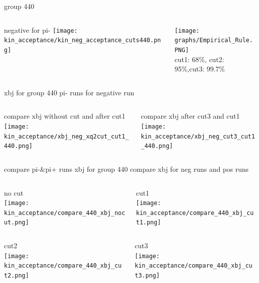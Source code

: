 \documentclass[aspectratio=169,xcolor=dvipsnames]{beamer}
\begin{document}
\begin{frame}{group 440}
  \begin{columns}
    \begin{column}[T]{0.5\textwidth}
      negative for pi-
      \texttt{[image: kin\_acceptance/kin\_neg\_acceptance\_cuts440.png]}
    \end{column}
    \begin{column}[T]{0.5\textwidth}
       \texttt{[image: graphs/Empirical\_Rule.PNG]}
       \\
       cut1: 68\%, cut2: 95\%,cut3: 99.7\% 
    \end{column}
  \end{columns}

\end{frame}

\begin{frame}{xbj for group 440 pi- runs}
  for negative run 
  \begin{columns}
    \begin{column}[T]{0.5\textwidth}
      compare xbj without cut and after cut1
      \texttt{[image: kin\_acceptance/xbj\_neg\_xq2cut\_cut1\_440.png]}
\end{column}
\begin{column}[T]{0.5\textwidth}
  compare xbj after cut3 and cut1
  \texttt{[image: kin\_acceptance/xbj\_neg\_cut3\_cut1\_440.png]}
\end{column}
\end{columns}
\end{frame}

\begin{frame}{compare pi-&pi+ runs xbj for group 440}
      compare xbj for neg runs and pos runs
  \begin{columns}
    \begin{column}[T]{0.5\textwidth}
      no cut\\
      \texttt{[image: kin\_acceptance/compare\_440\_xbj\_nocut.png]}
\end{column}
\begin{column}[T]{0.5\textwidth}
cut1\\
  \texttt{[image: kin\_acceptance/compare\_440\_xbj\_cut1.png]}
\end{column}
\end{columns}
  \begin{columns}
    \begin{column}[T]{0.5\textwidth}
       cut2\\
  \texttt{[image: kin\_acceptance/compare\_440\_xbj\_cut2.png]}
\end{column}
\begin{column}[T]{0.5\textwidth}
       cut3\\
  \texttt{[image: kin\_acceptance/compare\_440\_xbj\_cut3.png]}
\end{column}
\end{columns}
\end{frame}
\end{document}
